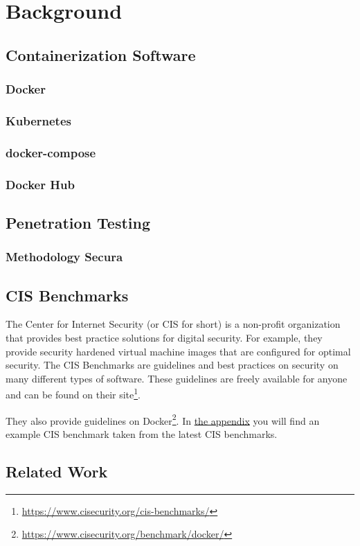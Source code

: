 \chapter{Background}

\section{Containerization Software}
\subsection{Docker}
\subsection{Kubernetes}
\subsection{docker-compose}
\subsection{Docker Hub}
\section{Penetration Testing}
\subsection{Methodology Secura}
\section{CIS Benchmarks}
The Center for Internet Security (or CIS for short) is a non-profit organization that provides best practice solutions for digital security. For example, they provide security hardened virtual machine images that are configured for optimal security.
The CIS Benchmarks are guidelines and best practices on security on many different types of software. These guidelines are freely available for anyone and can be found on their site\footnote{\url{https://www.cisecurity.org/cis-benchmarks/}}.

\hfill
They also provide guidelines on Docker\footnote{\url{https://www.cisecurity.org/benchmark/docker/}}. In \hyperref[appendix:a]{the appendix} you will find an example CIS benchmark taken from the latest CIS benchmarks.

\section{Related Work}
